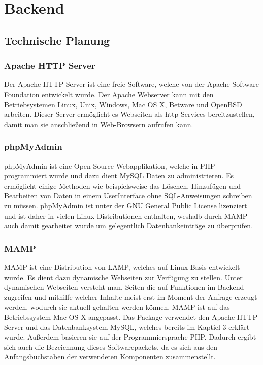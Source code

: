 \section{Backend}

  \subsection{Technische Planung}

    \subsubsection{Apache HTTP Server}

Der Apache HTTP Server ist eine freie Software, welche von der Apache Software Foundation entwickelt wurde. Der Apache Webserver kann mit den Betriebsystemen Linux, Unix, Windows, Mac OS X, Betware und OpenBSD arbeiten. Dieser Server ermöglicht es Webseiten als http-Services bereitzustellen, damit man sie anschließend in Web-Browsern aufrufen kann.

    \subsubsection{phpMyAdmin}
    
phpMyAdmin ist eine Open-Source Webapplikation, welche in PHP programmiert wurde und dazu dient MySQL Daten zu administrieren. Es ermöglicht einige Methoden wie beispielsweise das Löschen, Hinzufügen und Bearbeiten von Daten in einem UserInterface ohne SQL-Anweisungen schreiben zu müssen. phpMyAdmin ist unter der GNU General Public License lizenziert und ist daher in vielen Linux-Distributionen enthalten, weshalb durch MAMP auch damit gearbeitet wurde um gelegentlich Datenbankeinträge zu überprüfen.  

    \subsubsection{MAMP}

MAMP ist eine Distribution von LAMP, welches auf Linux-Basis entwickelt wurde. Es dient dazu dynamische Webseiten zur Verfügung zu stellen. Unter dynamischen Webseiten versteht man, Seiten die auf Funktionen im Backend zugreifen und mithilfe welcher Inhalte meist erst im Moment der Anfrage erzeugt werden, wodurch sie aktuell gehalten werden können. MAMP ist auf das Betriebssystem Mac OS X angepasst. Das Package verwendet den Apache HTTP Server und das Datenbanksystem MySQL, welches bereits im Kaptiel 3 erklärt wurde. Außerdem basieren sie auf der Programmiersprache PHP. Dadurch ergibt sich auch die Bezeichnung dieses Softwarepackets, da es sich aus den Anfangsbuchstaben der verwendeten Komponenten zusammenstellt.

